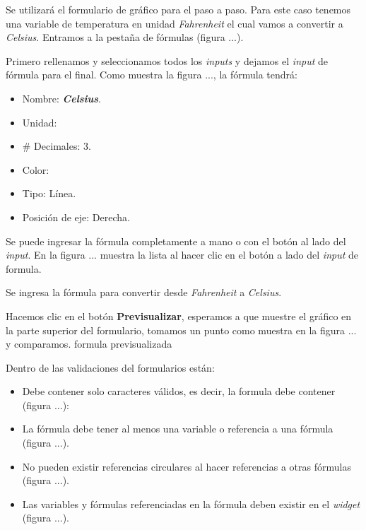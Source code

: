 Se utilizará el formulario de gráfico para el paso a paso. Para este caso tenemos una variable de temperatura en unidad \textit{Fahrenheit} el cual vamos a convertir a \textit{Celsius}.
Entramos a la pestaña de fórmulas (figura ...).
\iffalse ingresar a formulas \fi
Primero rellenamos y seleccionamos todos los \textit{inputs} y dejamos el \textit{input} de fórmula para el final. Como muestra la figura ..., la fórmula tendrá:
\begin{itemize}
	\item Nombre: \textbf{\textit{Celsius}}.
	\item Unidad: 
	\item # Decimales: 3.
	\item Color:
	\item Tipo: Línea.
	\item Posición de eje: Derecha.
\end{itemize}
\iffalse relleno de inputs \fi

Se puede ingresar la fórmula completamente a mano o con el botón al lado del \textit{input}. En la figura ... muestra la lista al hacer clic en el botón a lado del \textit{input} de formula.
\iffalse lista de boton \fi

Se ingresa la fórmula para convertir desde \textit{Fahrenheit} a \textit{Celsius}.
\iffalse formula \fi

Hacemos clic en el botón \textbf{Previsualizar}, esperamos a que muestre el gráfico en la parte superior del formulario, tomamos un punto como muestra en la figura ... y comparamos.
\iffalse formula previsualizada 
\iffalse formula con punto seleccionado
\begin{figure}[H]	
	\caption{\label{fig:formula-comparison} Comparación de fórmula. Fuente: Elaboración propia.}
\end{figure}
\fi

\iffalse agregar referencia a formulas\fi

Dentro de las validaciones del formularios están:
\begin{itemize}
    \item Debe contener solo caracteres válidos, es decir, la formula debe contener (figura ...): 
    \item La fórmula debe tener al menos una variable o referencia a una fórmula (figura ...).
    \item No pueden existir referencias circulares al hacer referencias a otras fórmulas (figura ...).
    \item Las variables y fórmulas referenciadas en la fórmula deben existir en el \textit{widget} (figura ...).        
\end{itemize}
\iffalse

